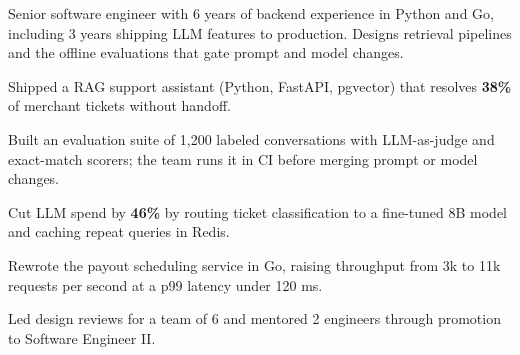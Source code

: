 

Senior software engineer with 6 years of backend experience in Python and Go,
including 3 years shipping LLM features to production. Designs retrieval pipelines
and the offline evaluations that gate prompt and model changes.

\begin{highlights}
  \item Shipped a RAG support assistant (Python, FastAPI, pgvector) that resolves
    \textbf{38\%} of merchant tickets without handoff.
  \item Built an evaluation suite of 1,200 labeled conversations with LLM-as-judge
    and exact-match scorers; the team runs it in CI before merging prompt or model changes.
  \item Cut LLM spend by \textbf{46\%} by routing ticket classification to a fine-tuned
    8B model and caching repeat queries in Redis.
  \item Rewrote the payout scheduling service in Go, raising throughput from 3k to
    11k requests per second at a p99 latency under 120 ms.
  \item Led design reviews for a team of 6 and mentored 2 engineers through
    promotion to Software Engineer II.
\end{highlights}

